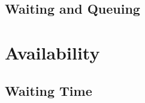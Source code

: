 \documentclass[8pt, hyperref={colorlinks=true}]{beamer}
\begin{document}
\subsection{Waiting and Queuing}

\section{Availability}

\subsection{Waiting Time}



\end{document}

